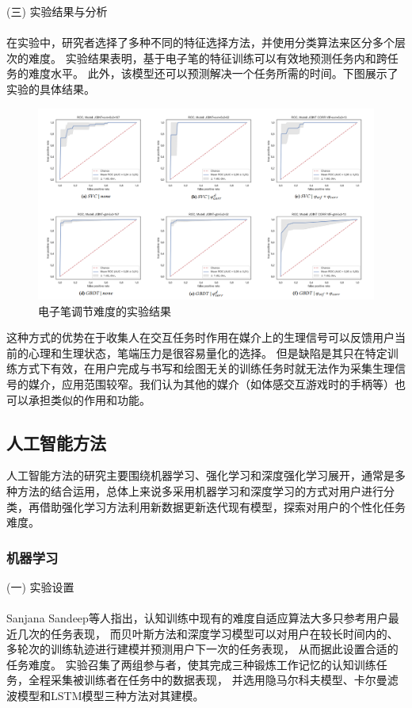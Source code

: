 \documentclass{article}
\begin{document}
            (三) 实验结果与分析\paragraph{}
            在实验中，研究者选择了多种不同的特征选择方法，并使用分类算法来区分多个层次的难度。
            实验结果表明，基于电子笔的特征训练可以有效地预测任务内和跨任务的难度水平。
            此外，该模型还可以预测解决一个任务所需的时间。下图展示了实验的具体结果。

            \begin{figure}[H]
        
            	\centering
            	\includegraphics[scale=0.3]{images/pen_result.png}
            	\caption{电子笔调节难度的实验结果}
            	\label{fig:label}
            \end{figure}

            这种方式的优势在于收集人在交互任务时作用在媒介上的生理信号可以反馈用户当前的心理和生理状态，笔端压力是很容易量化的选择。
            但是缺陷是其只在特定训练方式下有效，在用户完成与书写和绘图无关的训练任务时就无法作为采集生理信号的媒介，应用范围较窄。我们认为其他的媒介（如体感交互游戏时的手柄等）也可以承担类似的作用和功能。
            


            
        \subsection{人工智能方法}
        人工智能方法的研究主要围绕机器学习、强化学习和深度强化学习展开，通常是多种方法的结合运用，总体上来说多采用机器学习和深度学习的方式对用户进行分类，再借助强化学习方法利用新数据更新迭代现有模型，探索对用户的个性化任务难度。
            \subsubsection{机器学习}
            (一) 实验设置\paragraph{}
            Sanjana Sandeep\cite{ref16}等人指出，认知训练中现有的难度自适应算法大多只参考用户最近几次的任务表现，
            而贝叶斯方法和深度学习模型可以对用户在较长时间内的、多轮次的训练轨迹进行建模并预测用户下一次的任务表现，
            从而据此设置合适的任务难度。
            实验召集了两组参与者，使其完成三种锻炼工作记忆的认知训练任务，全程采集被训练者在任务中的数据表现，
            并选用隐马尔科夫模型、卡尔曼滤波模型和LSTM模型三种方法对其建模。
\end{document}

